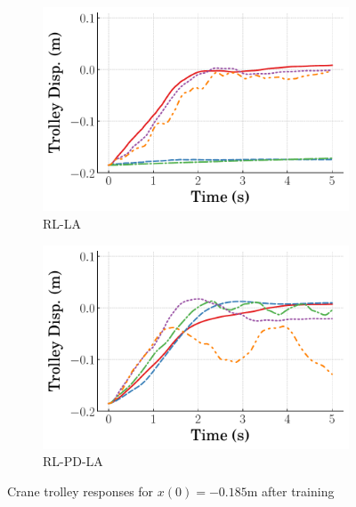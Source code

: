 \begin{figure}[h!]
    \hfill
    \begin{subfigure}[b]{0.49\textwidth}
        \centering
        \includegraphics[width=\textwidth]{figures/figures_RL_model_based_control/time_responses_crane/dpcrane_RL_LA/Cart_displacement_-0p185_init_300000_steps.pdf}
        \caption{RL-LA}
        \label{subfig_chap2:dpcrane_neg_trolley_resp_300000steps_RL_LA}
    \end{subfigure}
    \hfill
    \begin{subfigure}[b]{0.49\textwidth}
        \centering
        \includegraphics[width=\textwidth]{figures/figures_RL_model_based_control/time_responses_crane/dpcrane_RL_PD_LA/Cart_displacement_-0p185_init_300000_steps.pdf}
        \caption{RL-PD-LA}
        \label{subfig_chap2:dpcrane_neg_trolley_resp_300000steps_RL_PD_LA}
    \end{subfigure}
    \hfill
    \caption{Crane trolley responses for $x(0)=-0.185\si{\meter}$ after training}
    \label{fig_chap2:dpcrane_neg_trolley_resp_300000steps}
\end{figure}
